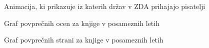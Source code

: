 \documentclass[11pt,a4paper]{article}
\begin{document}
\pagebreak
\begin{figure}[H]
\caption{Animacija, ki prikazuje iz katerih držav v ZDA prihajajo pisatelji}
\end{figure}

\pagebreak
\begin{figure}[H]

\caption{Graf povprečnih ocen za knjige v posameznih letih}
\end{figure}

\pagebreak
\begin{figure}[H]

\caption{Graf povprečnih strani za knjige v posameznih letih}
\end{figure}
\end{document}
